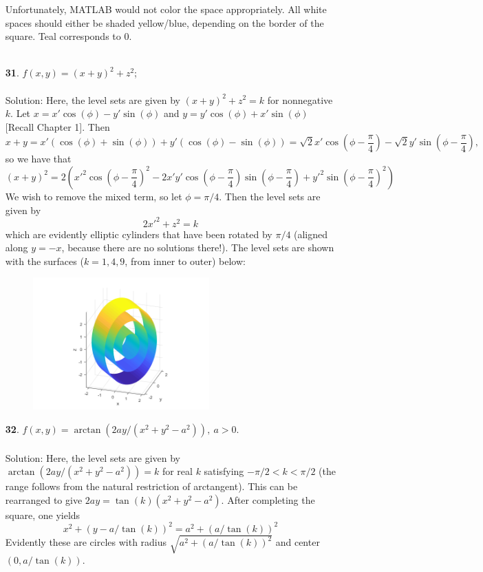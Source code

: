 \documentclass[12pt]{amsbook}
\begin{document}
\begin{enumerate}
\begin{center}
  \end{center}
  Unfortunately, MATLAB would not color the space appropriately. All white spaces should either be shaded yellow/blue, depending on the border of the square. Teal corresponds to $0$.
  \\
  \\
  \item[{\small\bf 31}.] $f(x,y)=(x+y)^2+z^2$;
  \\
  \\
  {\sc Solution}: Here, the level sets are given by $(x+y)^2+z^2=k$ for nonnegative $k$. Let $x=x'\cos(\phi)-y'\sin(\phi)$ and $y=y'\cos(\phi)+x'\sin(\phi)$ [Recall Chapter 1]. Then 
  $$x+y=x'(\cos(\phi)+\sin(\phi))+y'(\cos(\phi)-\sin(\phi))=\sqrt{2}x'\cos(\phi-\frac{\pi}{4})-\sqrt{2}y'\sin(\phi-\frac{\pi}{4}),$$
  so we have that
  $$(x+y)^2=2(x'^2\cos(\phi-\frac{\pi}{4})^2-2x'y'\cos(\phi-\frac{\pi}{4})\sin(\phi-\frac{\pi}{4})+y'^2\sin(\phi-\frac{\pi}{4})^2)$$
  We wish to remove the mixed term, so let $\phi = \pi/4$. Then the level sets are given by
  $$2x'^2+z^2=k$$
  which are evidently elliptic cylinders that have been rotated by $\pi/4$ (aligned along $y=-x$, because there are no solutions there!). 
   The level sets are shown with the surfaces ($k=1,4,9$, from inner to outer) below:
  \begin{center}
  \includegraphics[width=3.5in,height=2.0in]{3_1_31.png}
  \end{center}
  \item[{\small\bf 32}.] $f(x,y)=\arctan(2ay/(x^2+y^2-a^2)), \ a>0$.
  \\
  \\
  {\sc Solution}: Here, the level sets are given by $\arctan(2ay/(x^2+y^2-a^2))=k$ for real $k$ satisfying $-\pi/2<k<\pi/2$ (the range follows from the natural restriction of arctangent). This can be rearranged to give $2ay=\tan(k)(x^2+y^2-a^2)$. After completing the square, one yields
  $$x^2+(y-a/\tan(k))^2=a^2+(a/\tan(k))^2$$
  Evidently these are circles with radius $\sqrt{a^2+(a/\tan(k))^2}$ and center $(0,a/\tan(k))$. \

\end{enumerate}
\end{document}
